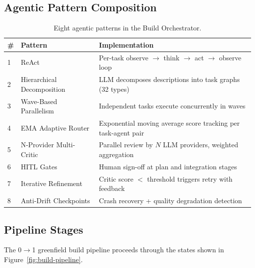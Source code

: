 \documentclass[11pt,a4paper]{article}
\begin{document}
\subsection{Agentic Pattern Composition}

\begin{table}[h]
\centering
\caption{Eight agentic patterns in the Build Orchestrator.}
\label{tab:patterns}
\begin{tabular}{llp{6cm}}
\toprule
\textbf{\#} & \textbf{Pattern} & \textbf{Implementation} \\
\midrule
1 & ReAct & Per-task observe $\rightarrow$ think $\rightarrow$ act $\rightarrow$ observe loop \\
2 & Hierarchical Decomposition & LLM decomposes descriptions into task graphs (32 types) \\
3 & Wave-Based Parallelism & Independent tasks execute concurrently in waves \\
4 & EMA Adaptive Router & Exponential moving average score tracking per task-agent pair \\
5 & N-Provider Multi-Critic & Parallel review by $N$ LLM providers, weighted aggregation \\
6 & HITL Gates & Human sign-off at plan and integration stages \\
7 & Iterative Refinement & Critic score $<$ threshold triggers retry with feedback \\
8 & Anti-Drift Checkpoints & Crash recovery + quality degradation detection \\
\bottomrule
\end{tabular}
\end{table}

\subsection{Pipeline Stages}

The 0$\rightarrow$1 greenfield build pipeline proceeds through the states shown in Figure~\ref{fig:build-pipeline}.
\end{document}
